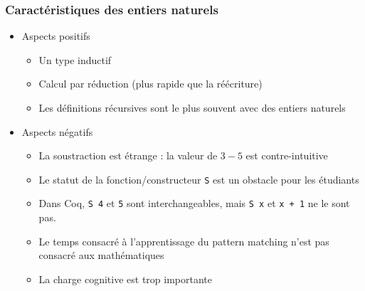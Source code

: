 \documentclass[compress]{beamer}
\begin{document}
\begin{frame}
\frametitle{Caract\'eristiques des entiers naturels}
\begin{itemize}
\item Aspects positifs
\begin{itemize}
\item Un type inductif
\item Calcul par r\'eduction (plus rapide que la r\'e\'ecriture)
\item Les d\'efinitions r\'ecursives sont le plus souvent avec des entiers naturels
\end{itemize}
\item Aspects n\'egatifs
\begin{itemize}
\item La soustraction est \'etrange : la valeur de \(3-5\) est contre-intuitive
\item Le statut de la fonction/constructeur {\tt S} est un obstacle pour les \'etudiants
\item Dans Coq, {\tt S 4} et {\tt 5} sont interchangeables,
mais {\tt S x} et {\tt x + 1} ne le sont pas.
\item Le temps consacr\'e \`a l'apprentissage du pattern matching n'est pas consacr\'e aux math\'ematiques
\item La charge cognitive est trop importante
\end{itemize}
\end{itemize}
\end{frame}
\iffalse 
\begin{frame}
\frametitle{Les nombres dans l'esprit des d\'ebutants en math\'ematiques}
\begin{itemize}
\item D\`es l'\^age de 15 ans, les enfants connaissent probablement les nombres entiers, rationnels et r\'eels.

\item Le nombre \(3 - 5\) existe en tant que nombre, il n'est pas 0.
\item Le calcul de \(127 - 42\) donne un nombre naturel, \(3 - 5\) un nombre entier,
et \(1 / 3\) un rationnel
\item Le calcul de \(42 / 6\) donne un nombre naturel
\item Cette perception est {\em juste}, la respecter permet de gagner du temps
\end{itemize}
\end{frame}
\fi
\end{document}
